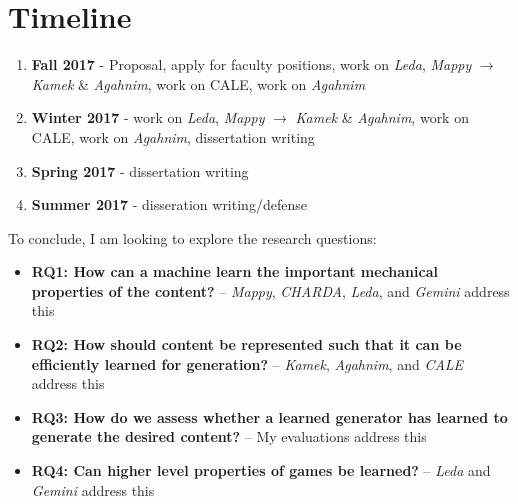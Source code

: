 \documentclass[12pt]{report}
\begin{document}
\chapter*{Timeline}

\begin{enumerate}
\item \textbf{Fall 2017} - Proposal, apply for faculty positions, work on \textit{Leda}, \textit{Mappy} $\rightarrow$ \textit{Kamek} \& \textit{Agahnim}, work on CALE, work on \textit{Agahnim}
\item \textbf{Winter 2017} - work on \textit{Leda}, \textit{Mappy} $\rightarrow$ \textit{Kamek} \& \textit{Agahnim}, work on CALE, work on \textit{Agahnim}, dissertation writing
\item \textbf{Spring 2017} - dissertation writing
\item \textbf{Summer 2017} - disseration writing/defense

\end{enumerate}

To conclude, I am looking to explore the research questions:

\begin{itemize}


\item \textbf{RQ1: How can a machine learn the important mechanical properties of the content?} -- \textit{Mappy}, \textit{CHARDA}, \textit{Leda}, and \textit{Gemini} address this


\item \textbf{RQ2: How should content be represented such that it can be efficiently learned for generation?} -- \textit{Kamek}, \textit{Agahnim}, and \textit{CALE} address this


\item \textbf{RQ3: How do we assess whether a learned generator has learned to generate the desired content?} -- My evaluations address this

\item \textbf{RQ4: Can higher level properties of games be learned?} -- \textit{Leda} and \textit{Gemini} address this

\end{itemize}






\end{document}
